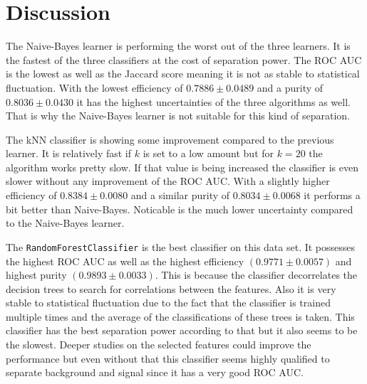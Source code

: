 \section{Discussion}
\label{sec:Diskussion}
The Naive-Bayes learner is performing the worst out of the three learners.
It is the fastest of the three classifiers at the cost of separation power.
The ROC AUC is the lowest as well as the Jaccard score meaning it is not as stable to statistical fluctuation.
With the lowest efficiency of $0.7886 \pm 0.0489$ and a purity of $0.8036 \pm 0.0430$ it has the highest uncertainties of the three algorithms as well.
That is why the Naive-Bayes learner is not suitable for this kind of separation.

The kNN classifier is showing some improvement compared to the previous learner.
It is relatively fast if $k$ is set to a low amount but for $k=20$ the algorithm works pretty slow.
If that value is being increased the classifier is even slower without any improvement of the ROC AUC.
With a slightly higher efficiency of $0.8384 \pm 0.0080$ and a similar purity of $0.8034 \pm 0.0068$ it performs a bit better than Naive-Bayes.
Noticable is the much lower uncertainty compared to the Naive-Bayes learner.

The \texttt{RandomForestClassifier} is the best classifier on this data set.
It possesses the highest ROC AUC as well as the highest efficiency $(0.9771 \pm 0.0057)$ and highest purity $(0.9893 \pm 0.0033)$.
This is because the classifier decorrelates the decision trees to search for correlations between the features.
Also it is very stable to statistical fluctuation due to the fact that the classifier is trained multiple times and the average of the classifications of these trees is taken.
This classifier has the best separation power according to that but it also seems to be the slowest.
Deeper studies on the selected features could improve the performance but even without that this classifier seems highly qualified to separate background and signal since it has a very good ROC AUC.

